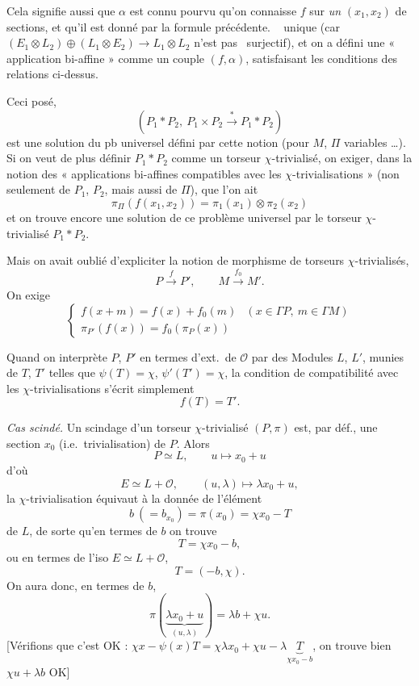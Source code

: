 \documentclass[11pt,a4paper]{article}
\begin{document}
Cela signifie aussi que $\alpha$ est connu  pourvu qu'on connaisse $f$ sur \emph{un}  $(x_1, x_2)$ de sections, et qu'il est donné par la formule précédente.
\  \ill{} unique (car $(E_1 \otimes L_2) \oplus (L_1 \otimes E_2) \to L_1 \otimes L_2$ n'est pas \ surjectif), et on a défini une « application bi-affine » comme un couple $(f, \alpha)$, satisfaisant les conditions des relations ci-dessus.

Ceci posé,
\[
  (P_1 * P_2,\ P_1 \times P_2 \xrightarrow{*} P_1 * P_2)
\]
est une solution du pb universel défini par cette notion (pour $M$, $\Pi$ variables …).
Si on veut de plus définir $P_1 * P_2$ comme un torseur $\chi$-trivialisé, on \emph{\ill{}} exiger, dans la notion des « applications bi-affines compatibles avec les $\chi$-trivialisations » (non seulement de $P_1$, $P_2$, mais aussi de $\Pi$), que l'on ait
\[
  \pi_{\Pi}(f(x_1, x_2)) = \pi_1(x_1) \otimes \pi_2(x_2)
\]
et on trouve encore une solution de ce problème universel par le torseur $\chi$-trivialisé $P_1 * P_2$.

Mais on avait oublié d'expliciter la notion de morphisme de torseurs $\chi$-trivialisés,
\[
  P \xrightarrow{f} P', \qquad M \xrightarrow{f_0} M' .
\]
On exige
\[
  \left\{\begin{array}{ll}
  f(x + m) = f(x) + f_0(m) & (x \in \Gamma P,\ m \in \Gamma M) \\
  \pi_{P'}(f(x)) = f_0(\pi_P(x))
  \end{array}\right.
\]

Quand on interprète $P$, $P'$ en termes d'ext.\ de $\mathcal{O}$ par des Modules $L$, $L'$, munies de $T$, $T'$ telles que $\psi(T) = \chi$, $\psi'(T') = \chi$, la condition de compatibilité avec les $\chi$-trivialisations s'écrit simplement
\[
  f(T) = T' .
\]

\emph{Cas scindé.} Un scindage d'un torseur $\chi$-trivialisé $(P, \pi)$ est, par déf., une section \struck{\ill{}} $x_0$ (i.e.\ trivialisation) de $P$. Alors
\[
  P \simeq L, \qquad u \mapsto x_0 + u
\]
d'où
\[
  E \simeq L + \mathcal{O}, \qquad (u, \lambda) \mapsto \lambda x_0 + u,
\]
la $\chi$-trivialisation équivaut à la donnée de l'élément
\[
  b\ (= b_{x_0}) = \pi(x_0) = \chi x_0 - T
\]
de $L$, de \struck{\ill{}} sorte qu'en termes de $b$ on trouve
\[
  T = \chi x_0 - b,
\]
ou en termes de l'iso $E \simeq L + \mathcal{O}$,
\[
  T = (-b, \chi).
\]
On aura donc, en termes de $b$,
\[
  \pi(\underbrace{\lambda x_0 + u}_{(u, \lambda)}) = \lambda b + \chi u .
\]
[Vérifions que c'est OK : $\chi x - \psi(x)T = \chi\lambda x_0 + \chi u - \lambda \underbrace{T}_{\chi x_0 - b}$, on trouve bien $\chi u + \lambda b$ OK]
\end{document}
